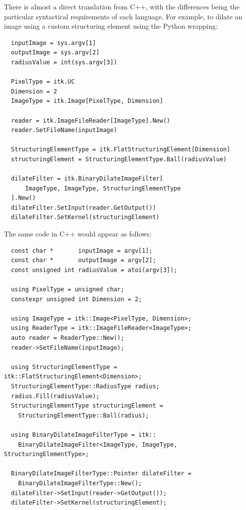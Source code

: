There is almost a direct translation from C++, with the differences being the
particular syntactical requirements of each language. For example, to dilate an
image using a custom structuring element using the Python wrapping:

\small
\begin{verbatim}
  inputImage = sys.argv[1]
  outputImage = sys.argv[2]
  radiusValue = int(sys.argv[3])

  PixelType = itk.UC
  Dimension = 2
  ImageType = itk.Image[PixelType, Dimension]

  reader = itk.ImageFileReader[ImageType].New()
  reader.SetFileName(inputImage)

  StructuringElementType = itk.FlatStructuringElement[Dimension]
  structuringElement = StructuringElementType.Ball(radiusValue)

  dilateFilter = itk.BinaryDilateImageFilter[
      ImageType, ImageType, StructuringElementType
  ].New()
  dilateFilter.SetInput(reader.GetOutput())
  dilateFilter.SetKernel(structuringElement)
\end{verbatim}
\normalsize
The same code in C++ would appear as follows:

\small
\begin{verbatim}
  const char *       inputImage = argv[1];
  const char *       outputImage = argv[2];
  const unsigned int radiusValue = atoi(argv[3]);

  using PixelType = unsigned char;
  constexpr unsigned int Dimension = 2;

  using ImageType = itk::Image<PixelType, Dimension>;
  using ReaderType = itk::ImageFileReader<ImageType>;
  auto reader = ReaderType::New();
  reader->SetFileName(inputImage);

  using StructuringElementType = itk::FlatStructuringElement<Dimension>;
  StructuringElementType::RadiusType radius;
  radius.Fill(radiusValue);
  StructuringElementType structuringElement =
    StructuringElementType::Ball(radius);

  using BinaryDilateImageFilterType = itk::
    BinaryDilateImageFilter<ImageType, ImageType, StructuringElementType>;

  BinaryDilateImageFilterType::Pointer dilateFilter =
    BinaryDilateImageFilterType::New();
  dilateFilter->SetInput(reader->GetOutput());
  dilateFilter->SetKernel(structuringElement);
\end{verbatim}
\normalsize

